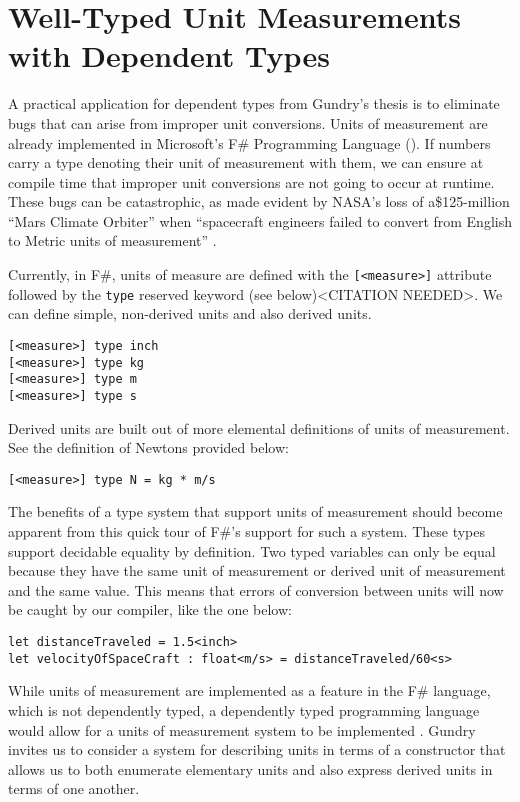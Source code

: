 \section{Well-Typed Unit Measurements with Dependent Types}


A practical application for dependent types from Gundry's thesis is to eliminate
bugs that can arise from improper unit conversions. Units of measurement are
already implemented in Microsoft's F\# Programming Language
(\cite{kennedy2009}). If numbers carry a type denoting their unit of measurement
with them, we can ensure at compile time that improper unit conversions are not
going to occur at runtime. These bugs can be catastrophic, as made evident by
NASA's loss of a\$125-million ``Mars Climate Orbiter'' when ``spacecraft
engineers failed to convert from English to Metric units of measurement''
\cite{hotz1999}. 

Currently, in F\#, units of measure are defined with the \texttt{[<measure>]}
attribute followed by the \texttt{type} reserved keyword (see below)<CITATION NEEDED>. We can define simple, non-derived units and also derived units. 

\texttt{[<measure>] type inch}\\
\texttt{[<measure>] type kg}\\
\texttt{[<measure>] type m}\\
\texttt{[<measure>] type s}

Derived units are built out of more elemental definitions of units of measurement. See the definition of Newtons provided below: 

\texttt{[<measure>] type N = kg * m/s}

The benefits of a type system that support units of measurement should become
apparent from this quick tour of F\#'s support for such a system. These types
support decidable equality by definition. Two typed variables can only be equal
because they have the same unit of measurement or derived unit of measurement
and the same value. This means that errors of conversion between units will now
be caught by our compiler, like the one below: 

\texttt{let distanceTraveled = 1.5<inch>}\\
\texttt{let velocityOfSpaceCraft : float<m/s> = distanceTraveled/60<s>}

While units of measurement are implemented as a feature in the F\# language,
which is not dependently typed, a dependently typed programming language would
allow for a units of measurement system to be implemented \cite{gundry2013}. Gundry invites us to consider a system for describing units in terms of a constructor that allows us to both enumerate elementary units and also express derived units in terms of one another. 

